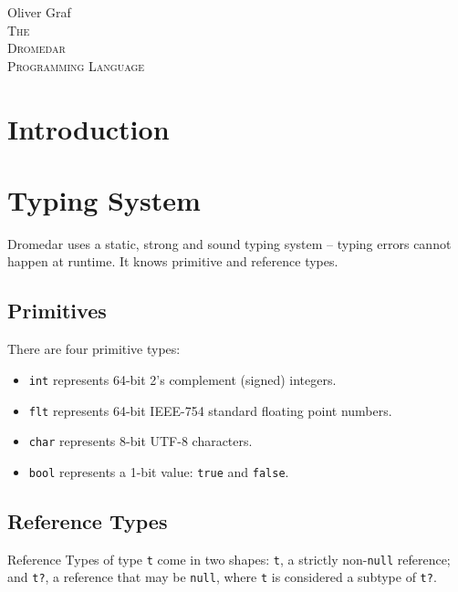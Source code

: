 \documentclass{article}
\newcommand{\code}[1]{\lstinline[columns=fixed]{#1}}
\begin{document}
	
	\vfill
	\begin{center}
		\large{Oliver Graf}\\
		\vspace{5cm}
		\large{\textsc{The}}\\\vspace{1cm}
		\Huge{\textsc{Dromedar}}\\\vspace{1cm}
		\large{\textsc{Programming Language}}
	\end{center}
	\vfill
	
	\clearpage
	
	\setcounter{tocdepth}{1}
	\tableofcontents
	\clearpage
	
	\section{Introduction}
	
	\section{Typing System}
	
		Dromedar uses a static, strong and sound typing system -- typing errors cannot happen at runtime. It knows primitive and reference types.
		
		\subsection{Primitives}
		
			There are four primitive types:
			
			\begin{itemize}
				\item \code{int} represents 64-bit 2's complement (signed) integers.
				\item \code{flt} represents 64-bit IEEE-754 standard floating point numbers.
				\item \code{char} represents 8-bit UTF-8 characters.
				\item \code{bool} represents a 1-bit value: \code{true} and \code{false}.
			\end{itemize}
		
		\subsection{Reference Types}
		
			Reference Types of type \code{t} come in two shapes: \code{t}, a strictly non-\code{null} reference; and \code{t?}, a reference that may be \code{null}, where \code{t} is considered a subtype of \code{t?}.
			
\end{document}
